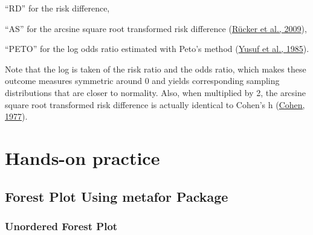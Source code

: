 \documentclass[
  11pt,
]{article}
\begin{document}
``RD'' for the risk difference,

``AS'' for the arcsine square root transformed risk difference (\protect\hyperlink{ref-Ruxfccker2009}{Rücker et al., 2009}),

``PETO'' for the log odds ratio estimated with Peto's method (\protect\hyperlink{ref-Yusuf1985}{Yusuf et al., 1985}).

Note that the log is taken of the risk ratio and the odds ratio, which makes these outcome measures symmetric around 0 and yields corresponding sampling distributions that are closer to normality. Also, when multiplied by 2, the arcsine square root transformed risk difference is actually identical to Cohen's h (\protect\hyperlink{ref-cohen1977}{Cohen, 1977}).

\hypertarget{hands-on-practice}{%
\section{Hands-on practice}\label{hands-on-practice}}

\hypertarget{forest-plot-using-metafor-package}{%
\subsection{Forest Plot Using metafor Package}\label{forest-plot-using-metafor-package}}

\hypertarget{unordered-forest-plot}{%
\subsubsection{Unordered Forest Plot}\label{unordered-forest-plot}}
\end{document}
